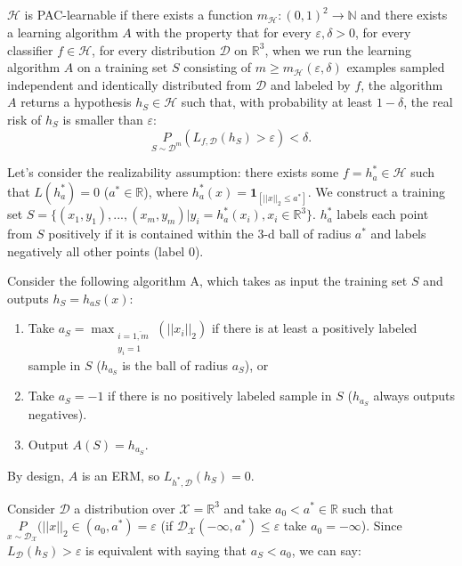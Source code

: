 \documentclass{article}
\begin{document}
\subsection{}
$\mathcal{H}$ is PAC-learnable if there exists a function $m_{\mathcal{H}}:(0,1)^2\rightarrow \mathbb{N}$ and there exists a learning algorithm $A$ with the property that for every $\varepsilon, \delta>0$, for every classifier $f\in\mathcal{H}$, for every distribution $\mathcal{D}$ on $\mathbb{R}^3$, when we run the learning algorithm $A$ on a training set $S$ consisting of $m\geq m_\mathcal{H}(\varepsilon,\delta)$ examples sampled independent and identically distributed from $\mathcal{D}$ and labeled by $f$, the algorithm $A$ returns a hypothesis $h_S\in\mathcal{H}$ such that, with probability at least $1-\delta$, the real risk of $h_S$ is smaller than $\varepsilon$:
$$
\underset{S\sim\mathcal{D}^m}P(L_{f,\mathcal{D}}(h_S)>\varepsilon) < \delta.
$$

Let's consider the realizability assumption: there exists some $f=h_a^*\in\mathcal{H}$ such that $L(h_a^*)=0$ ($a^*\in\mathbb{R}$), where $h_a^*(x)=\mathbf{1}_{[||x||_2\leq a^*]}$. We construct a training set 
$
S=\{ (x_1,y_1),..., (x_m,y_m) | y_i = h_a^*(x_i), x_i\in\mathbb{R}^3 \}$. $h_a^*$ labels each point from $S$ positively if it is contained within the 3-d ball of radius $a^*$ and labels negatively all other points (label 0).

Consider the following algorithm A, which takes as input the training set $S$ and outputs $h_S=h_{aS}(x)$:
\begin{enumerate}
	\item Take $a_S=\displaystyle\max_{\substack{i=\overline{1,m} \\ y_i=1}}(||x_i||_2)$ if there is at least a positively labeled sample in $S$ ($h_{a_S}$ is the ball of radius $a_S$), or
	\item Take $a_S=-1$ if there is no positively labeled sample in $S$ ($h_{a_S}$ always outputs negatives).
	\item Output $A(S)=h_{a_S}$.	
\end{enumerate}
By design, $A$ is an ERM, so $L_{h^*,\mathcal{D}}(h_{S})=0$.

Consider $\mathcal{D}$ a distribution over $\mathcal{X}=\mathbb{R}^3$ and take $a_0 < a^*\in\mathbb{R}$ such that $\underset{x\sim\mathcal{D}_{\mathcal{X}}}P(||x||_2\in(a_0,a^*)=\varepsilon$ (if $\mathcal{D}_{\mathcal{X}}(-\infty, a^*)\leq \varepsilon$ take $a_0=-\infty$). Since $L_\mathcal{D}(h_S)>\varepsilon$ is equivalent with saying that $a_S < a_0$, we can say:
\end{document}
